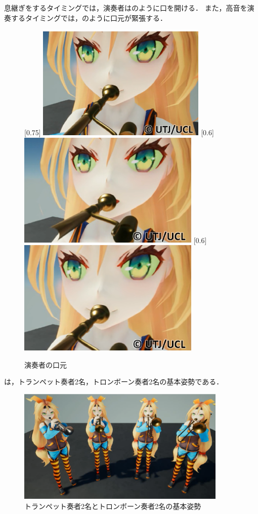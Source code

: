 息継ぎをするタイミングでは，演奏者はのように口を開ける．
また，高音を演奏するタイミングでは，のように口元が緊張する．
\begin{figure}[t]
	\centering
	[0.75\linewidth]{
		\includegraphics[height=5.5cm]{fig/chap4/anim1_zoom.eps}}
	[0.6\linewidth]{
		\includegraphics[height=5.5cm]{fig/chap4/anim1_zoom_breath.eps}}
	[0.6\linewidth]{
		\includegraphics[height=5.5cm]{fig/chap4/anim1_zoom_high.eps}}
	\caption{演奏者の口元}
	\label{fig:zoom}
\end{figure}
は，トランペット奏者2名，トロンボーン奏者2名の基本姿勢である．
\begin{figure}[h]
	\centering
	\includegraphics[width=10cm]{fig/chap4/anim2.eps}
	\caption{トランペット奏者2名とトロンボーン奏者2名の基本姿勢}
	\label{fig:anim2}
\end{figure}

